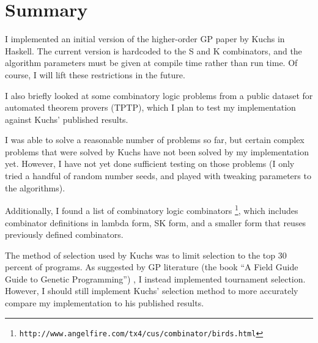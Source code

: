 \documentclass{article}
\begin{document}
\maketitle

\section{Summary}

I implemented an initial version of the higher-order GP paper by
Kuchs in Haskell. 
The current version is hardcoded to the S and K combinators, and the
algorithm parameters must be given at compile time rather than run
time. Of course, I will lift these restrictions in the future.

I also briefly looked at some combinatory logic problems from a public
dataset for automated theorem provers (TPTP), which I plan to test my
implementation against Kuchs' published results.

I was able to solve a reasonable number of problems so far, but
certain complex problems that were solved by Kuchs have not been
solved by my implementation yet. However, I have not yet done
sufficient testing on those problems (I only tried a handful of random
number seeds, and played with tweaking parameters to the algorithms).

Additionally, I found a list of combinatory logic combinators
\footnote{\texttt{http://www.angelfire.com/tx4/cus/combinator/birds.html}},
which includes combinator definitions in lambda form, SK form, and a
smaller form that reuses previously defined combinators.

The method of selection used by Kuchs was to limit selection to the
top 30 percent of programs. As suggested by GP literature
(the book ``A Field Guide Guide to Genetic Programming'')
, I instead implemented tournament selection. However, I should still
implement Kuchs' selection method to more accurately compare my
implementation to his published results.
\end{document}
